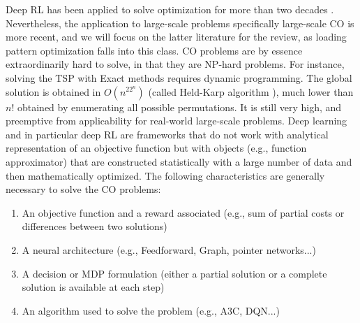 \documentclass[a4paper]{article}
\begin{document}
Deep RL has been applied to solve optimization for more than two decades \cite{bertsekas1996neuro}. Nevertheless, the application to large-scale problems specifically large-scale CO \cite{mazyavkina2021reinforcement} is more recent, and we will focus on the latter literature for the review, as loading pattern optimization falls into this class. CO problems are by essence extraordinarily  hard to solve, in that they are NP-hard problems. For instance, solving the TSP with Exact methods requires dynamic programming. The global solution is obtained in $O(n^22^n)$ (called Held-Karp algorithm \cite{bertsimas2008introduction}), much lower than $n!$ obtained by enumerating all possible permutations. It is still very high, and preemptive from applicability for real-world large-scale problems. Deep learning and in particular deep RL are frameworks that do not work with analytical representation of an objective function but with objects (e.g., function approximator) that are constructed statistically with a large number of data and then mathematically optimized. The following characteristics are generally necessary to solve the CO problems:
\begin{enumerate}
    \item 
    An objective function and a reward associated (e.g., sum of partial costs or differences between two solutions)
    \item
    A neural architecture (e.g., Feedforward, Graph, pointer networks...)
    \item
    A decision or MDP formulation (either a partial solution or a complete solution is available at each step)
    \item
    An algorithm used to solve the problem (e.g., A3C, DQN...)
\end{enumerate}
\end{document}
